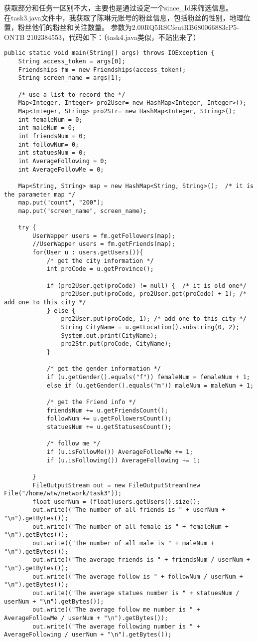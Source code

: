 \documentclass{article}
\begin{document}
获取部分和任务一区别不大，主要也是通过设定一个since\_Id来筛选信息。
\\在task3.java文件中，我获取了陈琳元账号的粉丝信息，包括粉丝的性别，地理位置，粉丝他们的粉丝和关注数量。
参数为2.00RQ5RSCfeutRB680066883cP5-ONTB 2102384553，代码如下：（task4.java类似，不贴出来了）
\begin{lstlisting}
public static void main(String[] args) throws IOException {
	String access_token = args[0];
	Friendships fm = new Friendships(access_token);
	String screen_name = args[1];
		
	/* use a list to record the */
	Map<Integer, Integer> pro2User= new HashMap<Integer, Integer>();
	Map<Integer, String> pro2Str= new HashMap<Integer, String>();
	int femaleNum = 0;
	int maleNum = 0;
	int friendsNum = 0;
	int followNum= 0;
	int statuesNum = 0;
	int AverageFollowing = 0;
	int AverageFollowMe = 0;

	Map<String, String> map = new HashMap<String, String>();  /* it is the parameter map */
	map.put("count", "200");		
	map.put("screen_name", screen_name);		
		
	try {
		UserWapper users = fm.getFollowers(map);
		//UserWapper users = fm.getFriends(map);
		for(User u : users.getUsers()){
			/* get the city information */
			int proCode = u.getProvince();
			
			if (pro2User.get(proCode) != null) {  /* it is old one*/
				pro2User.put(proCode, pro2User.get(proCode) + 1); /* add one to this city */
			} else {
				pro2User.put(proCode, 1); /* add one to this city */
				String CityName = u.getLocation().substring(0, 2);
				System.out.print(CityName);
				pro2Str.put(proCode, CityName);
			}
				
			/* get the gender information */
			if (u.getGender().equals("f")) femaleNum = femaleNum + 1;
			else if (u.getGender().equals("m")) maleNum = maleNum + 1;
				
			/* get the Friend info */
			friendsNum += u.getFriendsCount();
			followNum += u.getFollowersCount();
			statuesNum += u.getStatusesCount();
				
			/* follow me */
			if (u.isFollowMe()) AverageFollowMe += 1;
			if (u.isFollowing()) AverageFollowing += 1;

		}
		FileOutputStream out = new FileOutputStream(new File("/home/wtw/network/task3"));   
		float userNum = (float)users.getUsers().size();
		out.write(("The number of all friends is " + userNum + "\n").getBytes());
		out.write(("The number of all female is " + femaleNum + "\n").getBytes());
		out.write(("The number of all male is " + maleNum + "\n").getBytes());
		out.write(("The average friends is " + friendsNum / userNum + "\n").getBytes());
		out.write(("The average follow is " + followNum / userNum + "\n").getBytes());
		out.write(("The average statues number is " + statuesNum / userNum + "\n").getBytes());
		out.write(("The average follow me number is " + AverageFollowMe / userNum + "\n").getBytes());
		out.write(("The average following number is " + AverageFollowing / userNum + "\n").getBytes());


\end{lstlisting}
\end{document}
